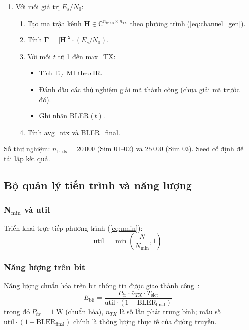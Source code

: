 \begin{enumerate}
    \item Với mỗi giá trị $E_s/N_0$:
    \begin{enumerate}
        \item Tạo ma trận kênh $\mathbf{H} \in \mathbb{C}^{n_{\text{trials}} \times n_{\text{TX}}}$ theo phương trình (\ref{eq:channel_gen}).
        \item Tính $\mathbf{\Gamma} = |\mathbf{H}|^2 \cdot (E_s/N_0)$.
        \item Với mỗi $t$ từ 1 đến max\_TX:
            \begin{itemize}
                \item Tích lũy MI theo IR.
                \item Đánh dấu các thử nghiệm giải mã thành công (chưa giải mã trước đó).
                \item Ghi nhận BLER$(t)$.
            \end{itemize}
        \item Tính avg\_ntx và BLER\_final.
    \end{enumerate}
\end{enumerate}

Số thử nghiệm: $n_{\text{trials}} = 20\,000$ (Sim 01--02) và $25\,000$ (Sim 03). Seed cố định để tái lập kết quả.

\subsection{Bộ quản lý tiến trình và năng lượng}

\subsubsection{N$_{\min}$ và util}

Triển khai trực tiếp phương trình (\ref{eq:nmin}):
\begin{equation}\label{eq:util}
    \text{util} = \min\!\left(\frac{N}{N_{\min}}, 1\right)
\end{equation}

\subsubsection{Năng lượng trên bit}

Năng lượng chuẩn hóa trên bit thông tin được giao thành công~\cite{tuninato2025}:
\begin{equation}\label{eq:ebit}
    E_{\text{bit}} = \frac{P_{tx} \cdot \bar{n}_{TX} \cdot T_{\text{slot}}}{\text{util} \cdot (1 - \text{BLER}_{\text{final}})}
\end{equation}
trong đó $P_{tx} = 1$ W (chuẩn hóa), $\bar{n}_{TX}$ là số lần phát trung bình; mẫu số $\text{util} \cdot (1 - \text{BLER}_{\text{final}})$ chính là thông lượng thực tế của đường truyền.

